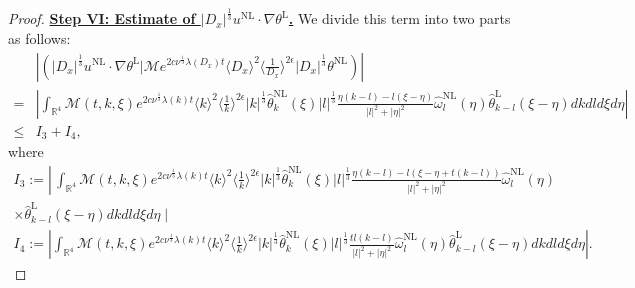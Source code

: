 \documentclass[reqno, 12pt]{amsart} %
\theoremstyle{plain} %
\theoremstyle{definition}
\theoremstyle{remark}
\numberwithin{equation}{section} %
\begin{document}
\begin{proof}
	
	
		\underline{\bf Step VI: Estimate of $  |D_x|^\frac13 u^{\mathrm{NL}} \cdot  \nabla  \theta^{\mathrm{L}}$.} We divide this term into two parts as follows:
		$$
		\begin{aligned}
			& \left|\left( |D_x|^\frac13 u^{\mathrm{NL}} \cdot \nabla  \theta^{\mathrm{L}} \big| \mathcal{M} e^{2 c \nu^{\frac{1}{3}} \lambda\left(D_x\right) t}\langle D_x\rangle^2\langle\frac{1}{D_x}\rangle^{2 \epsilon} |D_x|^\frac13 \theta^{\mathrm{NL}}\right)\right| \\
			= & \left|\int_{\mathbb{R}^4} \mathcal{M}(t, k, \xi) e^{2 c \nu^{\frac{1}{3}} \lambda(k) t}\langle k\rangle^2\langle\frac{1}{k}\rangle^{2 \epsilon} |k|^\frac13\hat{\theta}_k^{\mathrm{NL}}(\xi) |l|^\frac13  \frac{\eta(k-l)-l(\xi-\eta)}{|l|^2+|\eta|^2} \hat{\omega}_l^{\mathrm{NL}}(\eta) \hat{\theta}_{k-l}^{\mathrm{L}}(\xi-\eta) d k d l d \xi d \eta\right| \\
			\leq & I_3+I_4,
		\end{aligned}
		$$
		where
		$$
		\begin{gathered}
			I_3 :=\left\lvert\, \int_{\mathbb{R}^4} \mathcal{M}(t, k, \xi) e^{2 c \nu^{\frac{1}{3}} \lambda(k) t}\langle k\rangle^2\langle\frac{1}{k}\rangle^{2 \epsilon} |k|^\frac13\hat{\theta}_k^{\mathrm{NL}}(\xi) |l|^\frac13  \frac{\eta(k-l)-l(\xi-\eta+t(k-l))}{|l|^2+|\eta|^2} \hat{\omega}_l^{\mathrm{NL}}(\eta)\right. \\
			\times \hat{\theta}_{k-l}^{\mathrm{L}}(\xi-\eta) d k d l d \xi d \eta \mid \\
			I_4 :=\left|\int_{\mathbb{R}^4} \mathcal{M}(t, k, \xi) e^{2 c \nu^{\frac{1}{3}} \lambda(k) t}\langle k\rangle^2\langle\frac{1}{k}\rangle^{2 \epsilon} |k|^\frac13\hat{\theta}_k^{\mathrm{NL}}(\xi) |l|^\frac13  \frac{t l(k-l)}{|l|^2+|\eta|^2} \hat{\omega}_l^{\mathrm{NL}}(\eta) \hat{\theta}_{k-l}^{\mathrm{L}}(\xi-\eta) d k d l d \xi d \eta\right| .
		\end{gathered}
		$$  
		

\end{proof}
\end{document}
